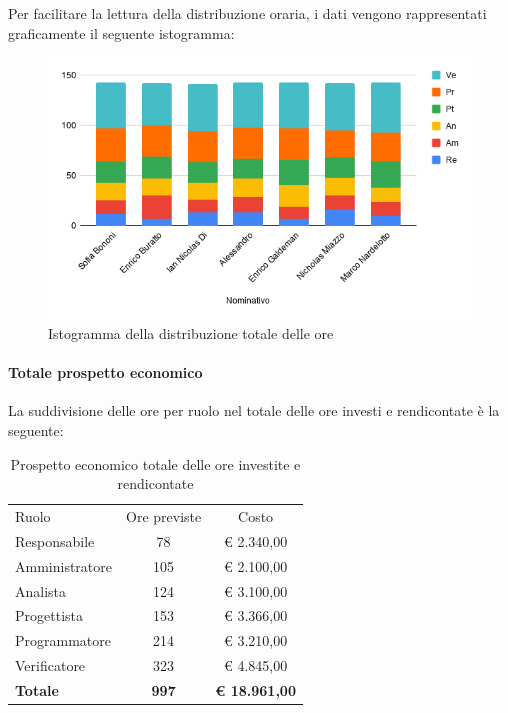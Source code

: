 \documentclass[../piano-di-progetto.tex]{subfiles}
\begin{document}
    Per facilitare la lettura della distribuzione oraria, i dati vengono rappresentati graficamente il seguente istogramma:
    \begin{figure}[H]
      \centering
      \includegraphics[width=12cm]{img/ore-totale.png}
      \caption{Istogramma della distribuzione totale delle ore}
      \label{fig:ore-totali}
    \end{figure}

    \paragraph{Totale prospetto economico}
    La suddivisione delle ore per ruolo nel totale delle ore investi e rendicontate è la seguente:
    \begin{table}[H]
      \centering
      \begin{tabular}{lcc}
        Ruolo           & Ore previste & Costo                \\
        Responsabile    & 78           & € 2.340,00           \\
        Amministratore  & 105          & € 2.100,00           \\
        Analista        & 124          & € 3.100,00           \\
        Progettista     & 153          & € 3.366,00           \\
        Programmatore   & 214          & € 3.210,00           \\
        Verificatore    & 323          & € 4.845,00           \\
        \textbf{Totale} & \textbf{997} & \textbf{€ 18.961,00}
      \end{tabular}
      \caption{Prospetto economico totale delle ore investite e rendicontate}
    \end{table}
\end{document}
